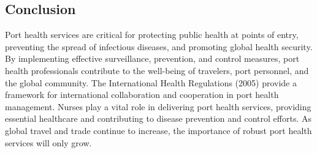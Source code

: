 \documentclass[12pt,a4paper]{article}
\begin{document}
\subsection*{Conclusion}
Port health services are critical for protecting public health at points of entry, preventing the spread of infectious diseases, and promoting global health security. By implementing effective surveillance, prevention, and control measures, port health professionals contribute to the well-being of travelers, port personnel, and the global community. The International Health Regulations (2005) provide a framework for international collaboration and cooperation in port health management. Nurses play a vital role in delivering port health services, providing essential healthcare and contributing to disease prevention and control efforts. As global travel and trade continue to increase, the importance of robust port health services will only grow.
\end{document}
